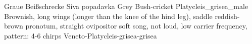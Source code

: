 {Graue Beißschrecke} %
{Siva popadavka} %
{Grey Bush-cricket} %
{Platycleis_grisea_male} {} %
{} {} %
{Brownish, long wings (longer than the knee of the hind leg), saddle reddish-brown pronotum, straight ovipositor} %
{soft song, not loud, low carrier frequency, pattern: 4-6 chirps} %
{Veneto-Platycleis-grisea-grisea} {} %

